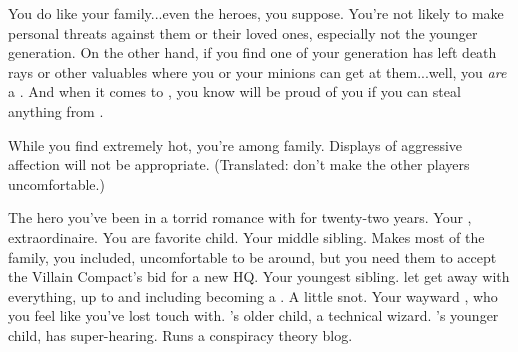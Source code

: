 \documentclass[char]{LRSguildcamp1}
\begin{document}
\begin{itemz}[Notes]
	\item You do like your family...even the heroes, you suppose.  You're not likely to make personal threats against them or their loved ones, especially not the younger generation.  On the other hand, if you find one of your generation has left death rays or other valuables where you or your minions can get at them...well, you \emph{are} a \cOldest{\villain}.  And when it comes to \cGrandma{\Parent}, you know \cGrandma{\they} will be proud of you if you can steal anything from \cGrandma{\them}.
	\item While you find \cOS{} extremely hot, you're among family.  Displays of aggressive affection will not be appropriate.  (Translated: don't make the other players uncomfortable.)
\end{itemz}

\begin{contacts}
	\contact{\cOS{}} The hero you've been in a torrid romance with for twenty-two years.
	\contact{\cGrandma{}} Your \cGrandma{\parent}, \cGrandma{\villain} extraordinaire.  You are \cGrandma{\their} favorite child.
	\contact{\cArchitect{}} Your middle sibling.  Makes most of the family, you included, uncomfortable to be around, but you need them to accept the Villain Compact's bid for a new HQ.
	\contact{\cYoungest{}} Your youngest sibling.  \cGrandma{\Parent} let \cYoungest{\them} get away with everything, up to and including becoming a \cYoungest{\hero}.  A little snot.
	\contact{\cGrad{}} Your wayward \cGrad{\offspring}, who you feel like you've lost touch with.
	\contact{\cTeen{}} \cArchitect{}'s older child, a technical wizard.
	\contact{\cTween{}} \cArchitect{}'s younger child, has super-hearing.  Runs a conspiracy theory blog.  
\end{contacts}
\end{document}
